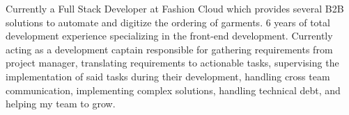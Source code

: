 

\begin{cvparagraph}

Currently a Full Stack Developer at Fashion Cloud which provides several B2B solutions to automate and digitize the ordering of garments. 6 years of total development experience specializing in the front-end development. Currently acting as a development captain responsible for gathering requirements from project manager, translating requirements to actionable tasks, supervising the implementation of said tasks during their development, handling cross team communication, implementing complex solutions, handling technical debt, and helping my team to grow.
\end{cvparagraph}
